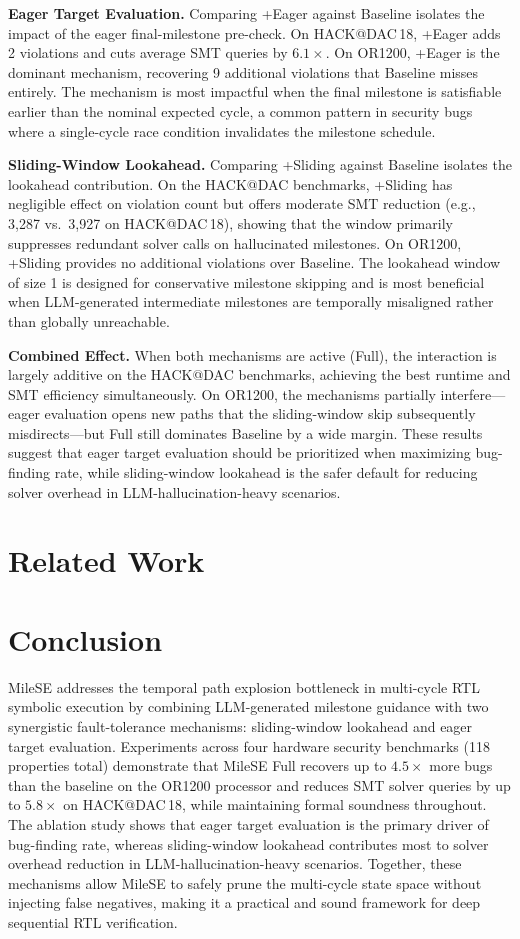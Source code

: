 \documentclass[conference]{IEEEtran}
\begin{document}
\textbf{Eager Target Evaluation.}
Comparing +Eager against Baseline isolates the impact of the eager final-milestone pre-check. On HACK@DAC\,18, +Eager adds 2 violations and cuts average SMT queries by $6.1\times$. On OR1200, +Eager is the dominant mechanism, recovering 9 additional violations that Baseline misses entirely. The mechanism is most impactful when the final milestone is satisfiable earlier than the nominal expected cycle, a common pattern in security bugs where a single-cycle race condition invalidates the milestone schedule.

\textbf{Sliding-Window Lookahead.}
Comparing +Sliding against Baseline isolates the lookahead contribution. On the HACK@DAC benchmarks, +Sliding has negligible effect on violation count but offers moderate SMT reduction (e.g., 3,287 vs.\ 3,927 on HACK@DAC\,18), showing that the window primarily suppresses redundant solver calls on hallucinated milestones. On OR1200, +Sliding provides no additional violations over Baseline. The lookahead window of size 1 is designed for conservative milestone skipping and is most beneficial when LLM-generated intermediate milestones are temporally misaligned rather than globally unreachable.

\textbf{Combined Effect.}
When both mechanisms are active (Full), the interaction is largely additive on the HACK@DAC benchmarks, achieving the best runtime and SMT efficiency simultaneously. On OR1200, the mechanisms partially interfere—eager evaluation opens new paths that the sliding-window skip subsequently misdirects—but Full still dominates Baseline by a wide margin. These results suggest that eager target evaluation should be prioritized when maximizing bug-finding rate, while sliding-window lookahead is the safer default for reducing solver overhead in LLM-hallucination-heavy scenarios.

\section{Related Work}
\label{sec:related}

\section{Conclusion}
\label{sec:conclusion}
MileSE addresses the temporal path explosion bottleneck in multi-cycle RTL symbolic execution by combining LLM-generated milestone guidance with two synergistic fault-tolerance mechanisms: sliding-window lookahead and eager target evaluation. Experiments across four hardware security benchmarks (118 properties total) demonstrate that MileSE Full recovers up to $4.5\times$ more bugs than the baseline on the OR1200 processor and reduces SMT solver queries by up to $5.8\times$ on HACK@DAC\,18, while maintaining formal soundness throughout. The ablation study shows that eager target evaluation is the primary driver of bug-finding rate, whereas sliding-window lookahead contributes most to solver overhead reduction in LLM-hallucination-heavy scenarios. Together, these mechanisms allow MileSE to safely prune the multi-cycle state space without injecting false negatives, making it a practical and sound framework for deep sequential RTL verification.
\end{document}

